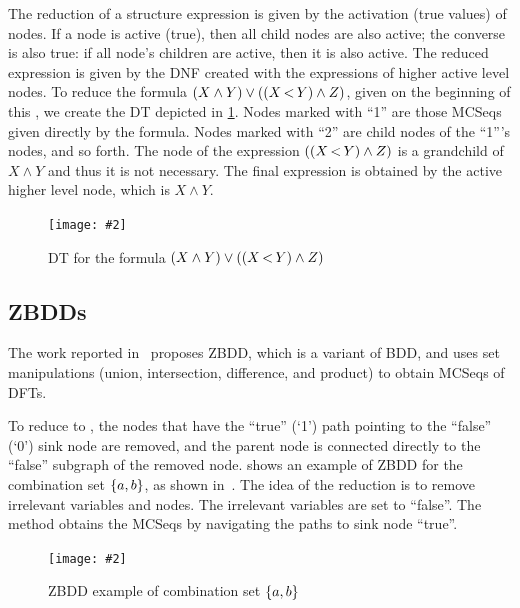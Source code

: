 \documentclass[12pt,openright,twoside,a4paper,oldfontcommands,english,brazil,final]{abntex2}
\theoremstyle{theo}
\newcommand{\includegraphicsaspectratio}[2][1]{%
  \texttt{[image: \#2]}%
}
\newcommand{\setsin}[1]{\ensuremath\left\{ #1 \right\}}
\newcommand{\parsin}[1]{\ensuremath\left( #1 \right)}
\def\pand{\ensuremath\operatorname{<}}
\begin{document}
The reduction of a structure expression is given by the activation (true values) of nodes.
If a node is active (true), then all child nodes are also active; the converse is also true: if all node's children are active, then it is also active.
The reduced expression is given by the \ac{DNF} created with the expressions of higher active level nodes.
To reduce the formula $\parsin{X \land Y} \lor \parsin{\parsin{X \pand Y} \land Z}$, given on the beginning of this , we create the \ac{DT} depicted in \cref{fig:dependency-tree-reduction}.
Nodes marked with ``1'' are those \acp{MCSeq} given directly by the formula.
Nodes marked with ``2'' are child nodes of the ``1'''s nodes, and so forth.
The node of the expression $\parsin{\parsin{X \pand Y} \land Z}$ is a grandchild of $X \land Y$ and thus it is not necessary.
The final expression is obtained by the active higher level node, which is $X \land Y$.

\begin{figure}[htb]
  \centering
  \includegraphicsaspectratio[0.7]{dependency-tree-reduction}
  \caption{\acs*{DT} for the formula $\parsin{X \land Y} \lor \parsin{\parsin{X \pand Y} \land Z}$}
  \label{fig:dependency-tree-reduction}
\end{figure}

\subsection{\Aclp*{ZBDD}}
\label{sec:zbdd}

The work reported in~\cite{TD2004} proposes \acl{ZBDD}, which is a variant of \ac{BDD}, and uses set manipulations (union, intersection, difference, and product) to obtain \acp{MCSeq} of \acp{DFT}.

To reduce  to , the nodes that have the ``true'' (`1') path pointing to the ``false'' (`0') sink node are removed, and the parent node is connected directly to the ``false'' subgraph of the removed node.
 shows an example of \ac{ZBDD} for the combination set $\setsin{a,b}$, as shown in~\cite{TD2004}.
The idea of the reduction is to remove irrelevant variables and nodes.
The irrelevant variables are set to ``false''.
The method obtains the \acp{MCSeq} by navigating the paths to sink node ``true''.

\begin{figure}[htb]
  \centering
  \includegraphicsaspectratio[0.7]{bdd-zbdd-example}
  \caption{\acs*{ZBDD} example of combination set $\setsin{a,b}$}
  \label{fig:zbdd-example}
\end{figure}
\end{document}
